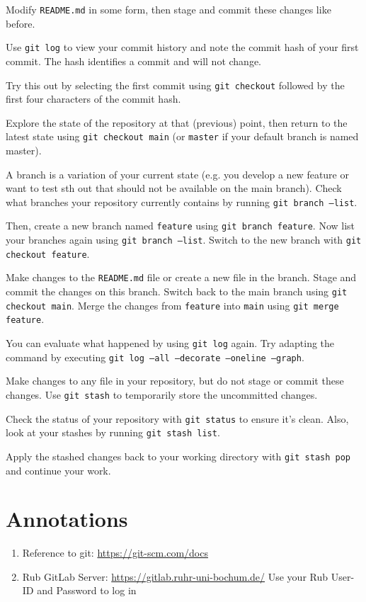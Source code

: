 \documentclass{dcbl/challenge}
\begin{document}
\begin{aufgabe}
    Modify \texttt{README.md} in some form, then stage and commit these changes like before.
    
    Use \texttt{git log} to view your commit history and note the commit hash of your first commit. The hash identifies a commit and will not change. 
    
    Try this out by selecting the first commit using \texttt{git checkout} followed by the first four characters of the commit hash.
    
    Explore the state of the repository at that (previous) point, then return to the latest state using \texttt{git checkout main} (or \texttt{master} if your default branch is named master).
    
\end{aufgabe}
\begin{aufgabe}
    A branch is a variation of your current state (e.g. you develop a new feature or want to test sth out that should not be available on the main branch). 
    Check what branches your repository currently contains by running \texttt{git branch --list}.
    
    Then, create a new branch named \texttt{feature} using \texttt{git branch feature}.
    Now list your branches again using \texttt{git branch --list}.
    Switch to the new branch with \texttt{git checkout feature}.
    
    Make changes to the \texttt{README.md} file or create a new file in the branch.
    Stage and commit the changes on this branch.
    Switch back to the main branch using \texttt{git checkout main}.
    Merge the changes from \texttt{feature} into \texttt{main} using \texttt{git merge feature}.

    You can evaluate what happened by using \texttt{git log} again. Try adapting the command by executing \texttt{git log --all --decorate --oneline --graph}.
    
    
\end{aufgabe}
\begin{aufgabe}
    Make changes to any file in your repository, but do not stage or commit these changes.
    Use \texttt{git stash} to temporarily store the uncommitted changes.
    
    Check the status of your repository with \texttt{git status} to ensure it's clean.
    Also, look at your stashes by running \texttt{git stash list}.
    
    Apply the stashed changes back to your working directory with \texttt{git stash pop} and continue your work.
\end{aufgabe}

\section*{Annotations}
\begin{enumerate}
    \item Reference to git: \url{https://git-scm.com/docs}
    \item Rub GitLab Server: \url{https://gitlab.ruhr-uni-bochum.de/} Use your Rub User-ID and Password to log in
\end{enumerate}
\end{document}
